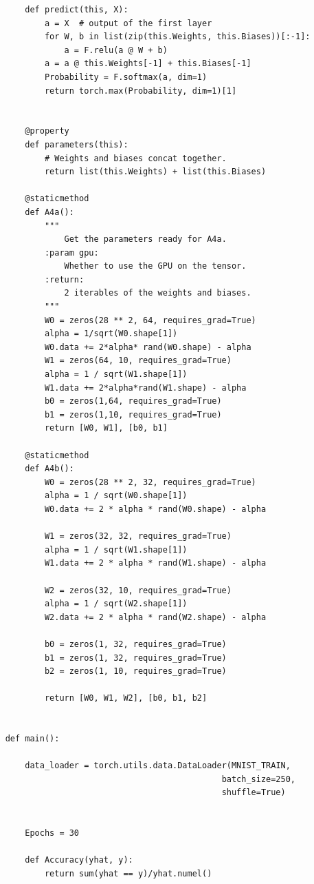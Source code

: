 \documentclass[]{article}
\begin{document}
\begin{lstlisting}
        def predict(this, X):
            a = X  # output of the first layer
            for W, b in list(zip(this.Weights, this.Biases))[:-1]:
                a = F.relu(a @ W + b)
            a = a @ this.Weights[-1] + this.Biases[-1]
            Probability = F.softmax(a, dim=1)
            return torch.max(Probability, dim=1)[1]


        @property
        def parameters(this):
            # Weights and biases concat together.
            return list(this.Weights) + list(this.Biases)

        @staticmethod
        def A4a():
            """
                Get the parameters ready for A4a.
            :param gpu:
                Whether to use the GPU on the tensor.
            :return:
                2 iterables of the weights and biases.
            """
            W0 = zeros(28 ** 2, 64, requires_grad=True)
            alpha = 1/sqrt(W0.shape[1])
            W0.data += 2*alpha* rand(W0.shape) - alpha
            W1 = zeros(64, 10, requires_grad=True)
            alpha = 1 / sqrt(W1.shape[1])
            W1.data += 2*alpha*rand(W1.shape) - alpha
            b0 = zeros(1,64, requires_grad=True)
            b1 = zeros(1,10, requires_grad=True)
            return [W0, W1], [b0, b1]

        @staticmethod
        def A4b():
            W0 = zeros(28 ** 2, 32, requires_grad=True)
            alpha = 1 / sqrt(W0.shape[1])
            W0.data += 2 * alpha * rand(W0.shape) - alpha

            W1 = zeros(32, 32, requires_grad=True)
            alpha = 1 / sqrt(W1.shape[1])
            W1.data += 2 * alpha * rand(W1.shape) - alpha

            W2 = zeros(32, 10, requires_grad=True)
            alpha = 1 / sqrt(W2.shape[1])
            W2.data += 2 * alpha * rand(W2.shape) - alpha

            b0 = zeros(1, 32, requires_grad=True)
            b1 = zeros(1, 32, requires_grad=True)
            b2 = zeros(1, 10, requires_grad=True)

            return [W0, W1, W2], [b0, b1, b2]


    def main():

        data_loader = torch.utils.data.DataLoader(MNIST_TRAIN,
                                                batch_size=250,
                                                shuffle=True)


        Epochs = 30

        def Accuracy(yhat, y):
            return sum(yhat == y)/yhat.numel()


\end{lstlisting}
\end{document}
